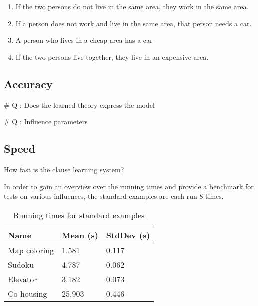 \begin{enumerate}
	\item If the two persons do not live in the same area, they work in the same area.
	\item If a person does not work and live in the same area, that person needs a car.
	\item A person who lives in a cheap area has a car
	\item If the two persons live together, they live in an expensive area.
\end{enumerate}

\subsection{Accuracy}

\# Q : Does the learned theory express the model

\# Q : Influence parameters

\subsection{Speed}

\begin{question}
	How fast is the clause learning system?
\end{question}

\begin{experiment}
	In order to gain an overview over the running times and provide a benchmark for tests on various influences, the standard examples are each run 8 times.
	
	\begin{table}[!htp]
		\begin{tabularx}{\textwidth}{XXX}
			\textbf{Name}	& \textbf{Mean (s)}	& \textbf{StdDev (s)} \\
			\toprule
			Map coloring 	& 1.581				& 0.117 \\
			Sudoku 			& 4.787				& 0.062 \\
			Elevator 		& 3.182 			& 0.073 \\
			Co-housing 		& 25.903			& 0.446
		\end{tabularx}
		\label{tbl:exp_speed_standard}
		\caption{Running times for standard examples}
	\end{table}

\end{experiment}

